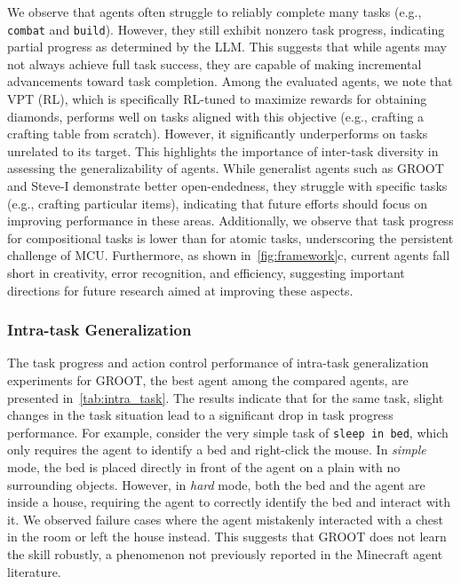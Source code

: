 We observe that agents often struggle to reliably complete many tasks (e.g., \texttt{combat} and \texttt{build}). However, they still exhibit nonzero task progress, indicating partial progress as determined by the LLM. This suggests that while agents may not always achieve full task success, they are capable of making incremental advancements toward task completion.
Among the evaluated agents, we note that VPT (RL), which is specifically RL-tuned to maximize rewards for obtaining diamonds, performs well on tasks aligned with this objective (e.g., crafting a crafting table from scratch). However, it significantly underperforms on tasks unrelated to its target. This highlights the importance of inter-task diversity in assessing the generalizability of agents. While generalist agents such as GROOT and Steve-I demonstrate better open-endedness, they struggle with specific tasks (e.g., crafting particular items), indicating that future efforts should focus on improving performance in these areas. 
Additionally, we observe that task progress for compositional tasks is lower than for atomic tasks, underscoring the persistent challenge of MCU. Furthermore, as shown in~\cref{fig:framework}c, current agents fall short in creativity, error recognition, and efficiency, suggesting important directions for future research aimed at improving these aspects.






\subsubsection{Intra-task Generalization}

The task progress and action control performance of intra-task generalization experiments for GROOT, the best agent among the compared agents, are presented in~\cref{tab:intra_task}. The results indicate that for the same task, slight changes in the task situation lead to a significant drop in task progress performance. For example, consider the very simple task of \texttt{sleep in bed}, which only requires the agent to identify a bed and right-click the mouse. In \emph{simple} mode, the bed is placed directly in front of the agent on a plain with no surrounding objects. However, in \emph{hard} mode, both the bed and the agent are inside a house, requiring the agent to correctly identify the bed and interact with it. We observed failure cases where the agent mistakenly interacted with a chest in the room or left the house instead. This suggests that GROOT does not learn the skill robustly, a phenomenon not previously reported in the Minecraft agent literature.

